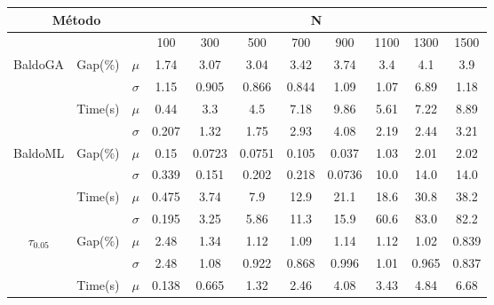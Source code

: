 \documentclass[spanish, a4paper, 12pt, openany,final]{book}
\begin{document}



	\begin{table}[h]
	\centering
	\begin{adjustbox}{width=\columnwidth,center}
		\begin{tabular}{|ccc|cccccccc|}
			\hline
			\multicolumn{3}{|c}{Método} & \multicolumn{8}{c|}{N}\\
			\hline
			\multicolumn{3}{|c|}{\text{}}  & 100  & 300  & 500  & 700  & 900  & 1100 & 1300 & 1500 \\
			\hline
			\multirow{4}{*}{BaldoGA}   & \multirow{2}{*}{Gap(\%)} 	  & $\mu$    & 1.74 & 3.07 & 3.04 & 3.42 & 3.74 & 3.4 & 4.1 & 3.9\\
			&                                                     	  & $\sigma$ & 1.15 & 0.905 & 0.866 & 0.844 & 1.09 & 1.07 & 6.89 & 1.18 \\
			\cline{3-11}
			& \multirow{2}{*}{Time(s)}  							  & $\mu$    & 0.44 & 3.3 & 4.5 & 7.18 & 9.86 & 5.61 & 7.22 & 8.89\\
			&                           							  & $\sigma$ & 0.207 & 1.32 & 1.75 & 2.93 & 4.08 & 2.19 & 2.44 & 3.21 \\ 
			\hline		 						 
			\multirow{4}{*}{BaldoML} & \multirow{2}{*}{Gap(\%)}       & $\mu$    & 0.15 & 0.0723 & 0.0751 & 0.105 & 0.037 & 1.03 & 2.01 & 2.02\\
			&                                                         & $\sigma$ & 0.339 & 0.151 & 0.202 & 0.218 & 0.0736 & 10.0 & 14.0 & 14.0 \\
			\cline{3-11}
			& \multirow{2}{*}{Time(s)}                                & $\mu$    & 0.475 & 3.74 & 7.9 & 12.9 & 21.1 & 18.6 & 30.8 & 38.2\\
			&                                                         & $\sigma$ & 0.195 & 3.25 & 5.86 & 11.3 & 15.9 & 60.6 & 83.0 & 82.2 \\
			\hline
			\multirow{4}{*}{$\tau_{0.05}$} & \multirow{2}{*}{Gap(\%)} & $\mu$    & 2.48 & 1.34 & 1.12 & 1.09 & 1.14 & 1.12 & 1.02 & 0.839\\
			&                                                         & $\sigma$ & 2.48 & 1.08 & 0.922 & 0.868 & 0.996 & 1.01 & 0.965 & 0.837 \\
			\cline{3-11}
			& \multirow{2}{*}{Time(s)}                                & $\mu$    & 0.138 & 0.665 & 1.32 & 2.46 & 4.08 & 3.43 & 4.84 & 6.68\\

\end{tabular}
\end{adjustbox}
\end{table}
\end{document}
